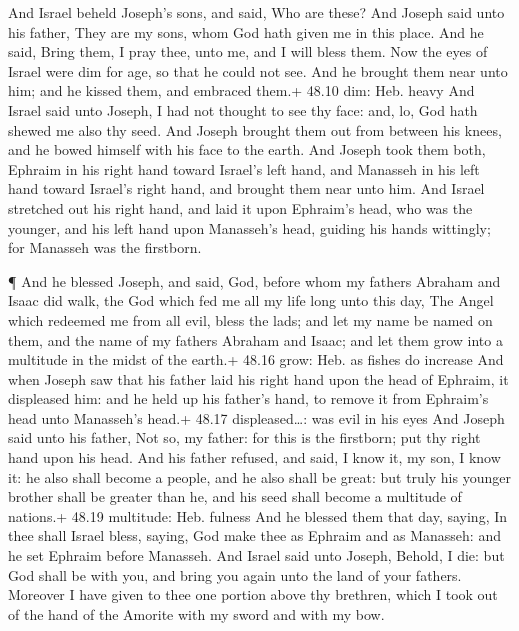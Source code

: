  And Israel beheld Joseph's sons, and said, Who are these?
 And Joseph said unto his father, They are my sons, whom God
hath given me in this place. And he said, Bring them, I pray thee, unto
me, and I will bless them.  Now the eyes of Israel were dim
for age, so that he could not see. And he brought them near unto him;
and he kissed them, and embraced them.+ 48.10 dim: Heb. heavy
 And Israel said unto Joseph, I had not thought to see thy
face: and, lo, God hath shewed me also thy seed.  And
Joseph brought them out from between his knees, and he bowed himself
with his face to the earth.  And Joseph took them both,
Ephraim in his right hand toward Israel's left hand, and Manasseh in his
left hand toward Israel's right hand, and brought them near unto him.
 And Israel stretched out his right hand, and laid it upon
Ephraim's head, who was the younger, and his left hand upon Manasseh's
head, guiding his hands wittingly; for Manasseh was the firstborn.

 ¶ And he blessed Joseph, and said, God, before whom my
fathers Abraham and Isaac did walk, the God which fed me all my life
long unto this day,  The Angel which redeemed me from all
evil, bless the lads; and let my name be named on them, and the name of
my fathers Abraham and Isaac; and let them grow into a multitude in the
midst of the earth.+ 48.16 grow: Heb. as fishes do increase
 And when Joseph saw that his father laid his right hand
upon the head of Ephraim, it displeased him: and he held up his father's
hand, to remove it from Ephraim's head unto Manasseh's head.+ 48.17
displeased\ldots: was evil in his eyes  And Joseph said
unto his father, Not so, my father: for this is the firstborn; put thy
right hand upon his head.  And his father refused, and
said, I know it, my son, I know it: he also shall become a people, and
he also shall be great: but truly his younger brother shall be greater
than he, and his seed shall become a multitude of nations.+ 48.19
multitude: Heb. fulness  And he blessed them that day,
saying, In thee shall Israel bless, saying, God make thee as Ephraim and
as Manasseh: and he set Ephraim before Manasseh.  And
Israel said unto Joseph, Behold, I die: but God shall be with you, and
bring you again unto the land of your fathers.  Moreover I
have given to thee one portion above thy brethren, which I took out of
the hand of the Amorite with my sword and with my bow.

